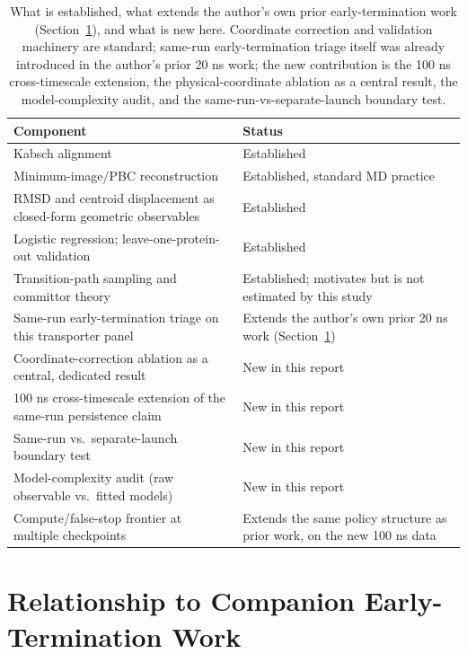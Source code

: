 \documentclass[11pt]{article}
\begin{document}
\begin{table}[htbp]
\centering
\caption{What is established, what extends the author's own prior early-termination work (Section~\ref{sec:companion}), and what is new here. Coordinate correction and validation machinery are standard; same-run early-termination triage itself was already introduced in the author's prior 20 ns work; the new contribution is the 100 ns cross-timescale extension, the physical-coordinate ablation as a central result, the model-complexity audit, and the same-run-vs-separate-launch boundary test.}
\label{tab:prior-art}
\small
\begin{tabularx}{\textwidth}{Xl}
\toprule
\textbf{Component} & \textbf{Status} \\
\midrule
Kabsch alignment \cite{kabsch1976} & Established \\
Minimum-image/PBC reconstruction & Established, standard MD practice \\
RMSD and centroid displacement as closed-form geometric observables & Established \\
Logistic regression; leave-one-protein-out validation & Established \\
Transition-path sampling and committor theory \cite{bolhuis2002tps,e2006towards,peters2016reaction} & Established; motivates but is not estimated by this study \\
Same-run early-termination triage on this transporter panel & Extends the author's own prior 20 ns work \cite{jing2026embs} (Section~\ref{sec:companion}) \\
Coordinate-correction ablation as a central, dedicated result & New in this report \\
100 ns cross-timescale extension of the same-run persistence claim & New in this report \\
Same-run vs.\ separate-launch boundary test & New in this report \\
Model-complexity audit (raw observable vs.\ fitted models) & New in this report \\
Compute/false-stop frontier at multiple checkpoints & Extends the same policy structure as prior work, on the new 100 ns data \\
\bottomrule
\end{tabularx}
\end{table}

\section{Relationship to Companion Early-Termination Work}
\label{sec:companion}
\end{document}
